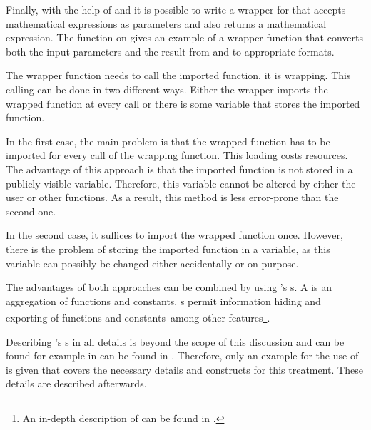 Finally, with the help of  and  it is possible to write a wrapper for \exportedsymbol that accepts mathematical expressions as parameters and also returns a mathematical expression. The function  on  gives an example of a wrapper function that converts both the input parameters and the result from and to appropriate formats.

The wrapper function needs to call the imported function, it is wrapping. This calling can be done in two different ways. Either the wrapper imports the wrapped function at every call or there is some variable that stores the imported function.

In the first case, the main problem is that the wrapped function has to be imported for every call of the wrapping function. This loading costs resources. The advantage of this approach is that the imported function is not stored in a publicly visible variable. Therefore, this variable cannot be altered by either the user or other functions. As a result, this method is less error-prone than the second one.

In the second case, it suffices to import the wrapped function once. However, there is the problem of storing the imported function in a variable, as this variable can possibly be changed either accidentally or on purpose.

The advantages of both approaches can be combined by using \Maple's s. A  is an aggregation of functions and constants. s permit information hiding and exporting of functions and constants\ among other features\footnote{An in-depth description of  can be found in \cite{Maple9AdvancedProgramming}.}.

Describing \Maple's s in all details is beyond the scope of this discussion and can be found for example in can be found in \cite{Maple9AdvancedProgramming}. Therefore, only an example for the use of  is given that covers the necessary details and constructs for this treatment. These details are described afterwards.

